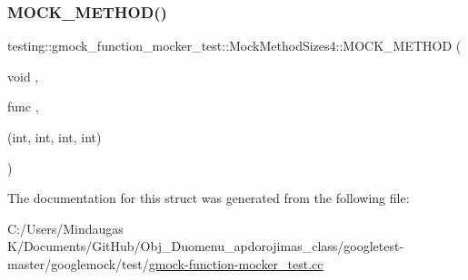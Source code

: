 \mbox{\label{structtesting_1_1gmock__function__mocker__test_1_1_mock_method_sizes4_a026e4cb12aefad0481229b30044cc93e}} 
\subsubsection{\texorpdfstring{MOCK\_METHOD()}{MOCK\_METHOD()}\hspace{0.1cm}{\footnotesize\ttfamily [2/2]}}
{\footnotesize\ttfamily testing\+::gmock\+\_\+function\+\_\+mocker\+\_\+test\+::\+Mock\+Method\+Sizes4\+::\+M\+O\+C\+K\+\_\+\+M\+E\+T\+H\+OD (\begin{DoxyParamCaption}\item[{void}]{,  }\item[{func}]{,  }\item[{(int, int, int, int)}]{ }\end{DoxyParamCaption})}



The documentation for this struct was generated from the following file\+:\begin{DoxyCompactItemize}
\item 
C\+:/\+Users/\+Mindaugas K/\+Documents/\+Git\+Hub/\+Obj\+\_\+\+Duomenu\+\_\+apdorojimas\+\_\+class/googletest-\/master/googlemock/test/\mbox{\hyperlink{googletest-master_2googlemock_2test_2gmock-function-mocker__test_8cc}{gmock-\/function-\/mocker\+\_\+test.\+cc}}\end{DoxyCompactItemize}
